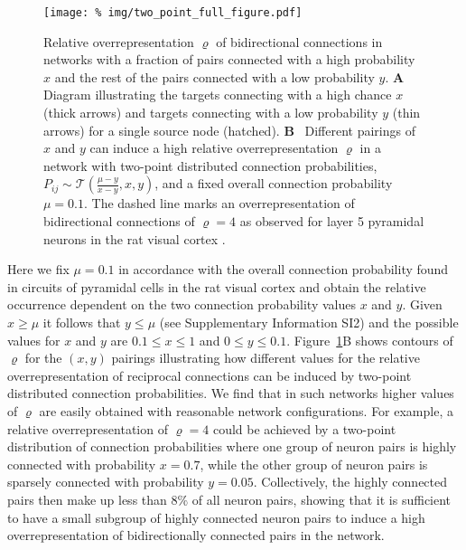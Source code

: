 \begin{figure}[h!]
\centering
\texttt{[image: \%
    img/two\_point\_full\_figure.pdf]}
\caption{Relative overrepresentation $\varrho$ of bidirectional
  connections in networks with a fraction of pairs connected with a
  high probability $x$ and the rest of the pairs connected with a low
  probability $y$. \textbf{A}~ Diagram illustrating the targets
  connecting with a high chance $x$ (thick arrows) and targets
  connecting with a low probability $y$ (thin arrows) for a single
  source node (hatched). \textbf{B}~ Different pairings of $x$ and $y$
  can induce a high relative overrepresentation $\varrho$ in a network
  with two-point distributed connection probabilities, $P_{ij} \sim
  \mathcal{T}(\frac{\mu-y}{x-y},x,y)$, and a fixed overall connection
  probability $\mu = 0.1$. The dashed line marks an overrepresentation
  of bidirectional connections of $\varrho=4$ as observed for layer 5
  pyramidal neurons in the rat visual cortex \cite{Song2005}.}
\label{fig:tp}
\end{figure}

%
Here we fix $\mu = 0.1$ in accordance with the overall connection
probability found in circuits of pyramidal cells in the rat visual
cortex \cite{Song2005} and obtain the relative occurrence dependent
on the two connection probability values $x$ and $y$.
%
Given $x \geq \mu$ it follows that $y \leq \mu$ (see Supplementary
Information SI2) and the possible values for $x$ and $y$ are $0.1 \leq x
\leq 1$ and $0 \leq y \leq 0.1$.
%
Figure~\ref{fig:tp}B shows contours of $\varrho$ for the $(x,y)$
pairings illustrating how different values for the relative
overrepresentation of reciprocal connections can be induced by
two-point distributed connection probabilities.
%
We find that in such networks higher values of $\varrho$ are easily
obtained with reasonable network configurations. %
%
For example, a relative overrepresentation of $\varrho=4$ could be
achieved by a two-point distribution of connection probabilities where
one group of neuron pairs is highly connected with probability
$x=0.7$, while the other group of neuron pairs is sparsely connected
with probability $y=0.05$.
%
Collectively, the highly connected pairs then make up less than $8\%$
of all neuron pairs, showing that it is sufficient to have a small
subgroup of highly connected neuron pairs to induce a high
overrepresentation of bidirectionally connected pairs in the network.





